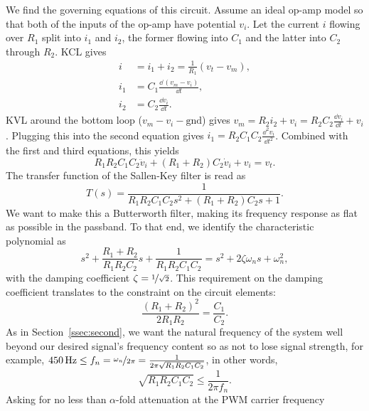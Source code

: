 We find the governing equations of this circuit. Assume an ideal op-amp model so
that both of the inputs of the op-amp have potential $v_i$. Let the current $i$
flowing over $R_{1}$ split into $i_1$ and $i_2$, the former flowing into
$C_{1}$ and the latter into $C_2$ through $R_2$. KCL gives
%
\begin{align*}
    i &= i_1 + i_2 = \frac{1}{R_{1}}(v_t - v_m), \\
    i_1 &= C_{1} \frac{\dd\, (v_m - v_i)}{\dd t}, \\
    i_2 &= C_2 \frac{\dd v_i}{\dd t}.
\end{align*}
%
KVL around the bottom loop ($v_m - v_i - \text{gnd}$) gives $v_m = R_2i_2 +
v_i = R_2C_2\frac{\dd v_i}{\dd t} + v_i$. Plugging this into the second
equation gives $i_1 = R_2C_{1}C_2\frac{\dd^2v_i}{\dd t^2}$. Combined with
the first and third equations, this yields
%
\begin{equation}
    R_{1}R_2C_{1}C_2\ddot{v}_i + (R_{1} + R_2)C_2\dot{v}_i + v_i
    = v_t.
    \label{eq:sallenkey_de}
\end{equation}
%
The transfer function of the Sallen-Key filter is read as
%
\begin{equation}
    T(s) = \frac{1}{R_{1}R_2C_{1}C_2s^2 + (R_{1}+R_2)C_2s + 1}.
    \label{eq:tf_sallenkey}
\end{equation}
%
We want to make this a Butterworth filter, making its frequency response as flat
as possible in the passband. To that end, we identify the characteristic
polynomial as
\[s^2 + \frac{R_1+R_2}{R_1R_2C_2}s + \frac{1}{R_1R_2C_1C_2} = s^2 +
2\zeta\omega_ns + \omega_n^2,\] with the damping coefficient $\zeta =
\nicefrac{1}{\sqrt{2}}$. This requirement on the damping coefficient translates
to the constraint on the circuit elements:
%
\begin{equation}
    \frac{(R_1+R_2)^2}{2R_1R_2} = \frac{C_1}{C_2}. 
    \label{eq:cons1}
\end{equation}
%
As in Section~\ref{ssec:second}, we want the natural frequency of the system
well beyond our desired signal's frequency content so as not to lose signal
strength, for example, $450\,\unit{\hertz} \leq f_n = \nicefrac{\omega_n}{2\pi} =
\frac{1}{2\pi\sqrt{R_1R_2C_1C_2}}$, in other words,
%
\begin{equation}
    \sqrt{R_1R_2C_1C_2} \leq \frac{1}{2\pi f_n}.
    \label{eq:cons2}
\end{equation}
%
Asking for no less than $\alpha$-fold attenuation at the PWM carrier frequency
